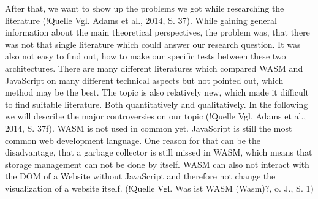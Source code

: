 After that, we want to show up the problems we got while researching the literature (!Quelle Vgl. Adams et al., 2014, S. 37). While gaining general information about the main theoretical perspectives, the problem was, that there was not that single literature which could answer our research question. It was also not easy to find out, how to make our specific tests between these two architectures. There are many different literatures which compared WASM and JavaScript on many different technical aspects but not pointed out, which method may be the best. The topic is also relatively new, which made it difficult to find suitable literature. Both quantitatively and qualitatively.
In the following we will describe the major controversies on our topic (!Quelle Vgl. Adams et al., 2014, S. 37f). WASM is not used in common yet. JavaScript is still the most common web development language. One reason for that can be the disadvantage, that a garbage collector is still missed in WASM, which means that storage management can not be done by itself. WASM can also not interact with the DOM of a Website without JavaScript and therefore not change the visualization of a website itself. (!Quelle Vgl. Was ist WASM (Wasm)?, o. J., S. 1)
